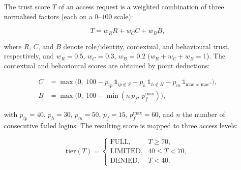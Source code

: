 %
%


The trust score $T$ of an access request is a weighted combination of three
normalised factors (each on a $0$--$100$ scale):

\begin{equation}
  T = w_R R + w_C C + w_B B,
  \label{eq:trust}
\end{equation}

\noindent where $R$, $C$, and $B$ denote role/identity, contextual, and
behavioural trust, respectively, and $w_R=0.5$, $w_C=0.3$, $w_B=0.2$
($w_R+w_C+w_B=1$). The contextual and behavioural scores are obtained by
point deductions:

\begin{align}
  C &= \max\!\big(0,\; 100 - p_{ip}\,\mathbb{1}_{ip\notin S}
        - p_{h}\,\mathbb{1}_{h\notin H}
        - p_{m}\,\mathbb{1}_{\text{mac}\neq\text{mac}^\ast}\big),
  \label{eq:context}\\
  B &= \max\!\big(0,\; 100 - \min(n\,p_{f},\, p_{f}^{\max})\big),
  \label{eq:behaviour}
\end{align}

\noindent with $p_{ip}=40$, $p_h=30$, $p_m=50$, $p_f=15$, $p_f^{\max}=60$,
and $n$ the number of consecutive failed logins. The resulting score is
mapped to three access levels:

\begin{equation}
  \text{tier}(T) =
  \begin{cases}
    \text{FULL},    & T \ge 70,\\
    \text{LIMITED}, & 40 \le T < 70,\\
    \text{DENIED},  & T < 40.
  \end{cases}
  \label{eq:tier}
\end{equation}


